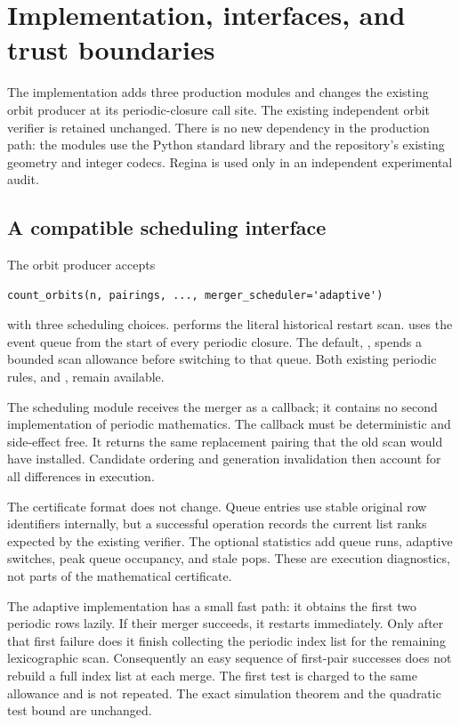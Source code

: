 \section{Implementation, interfaces, and trust boundaries}
\label{sec:implementation}

The implementation adds three production modules and changes the existing
orbit producer at its periodic-closure call site.  The existing independent
orbit verifier is retained unchanged.  There is no new dependency in the
production path: the modules use the Python standard library and the
repository's existing geometry and integer codecs.  Regina is used only in
an independent experimental audit.

\subsection{A compatible scheduling interface}

The orbit producer accepts
\begin{verbatim}
count_orbits(n, pairings, ..., merger_scheduler='adaptive')
\end{verbatim}
with three scheduling choices.   performs the literal historical
restart scan.   uses the event queue from the start of every
periodic closure.  The default, , spends a bounded scan
allowance before switching to that queue.  Both existing periodic rules,
 and , remain available.

The scheduling module receives the merger as a callback; it contains no
second implementation of periodic mathematics.  The callback must be
deterministic and side-effect free.  It returns the same replacement pairing
that the old scan would have installed.  Candidate ordering and generation
invalidation then account for all differences in execution.

The certificate format does not change.  Queue entries use stable original
row identifiers internally, but a successful operation records the current
list ranks expected by the existing verifier.  The optional statistics add
queue runs, adaptive switches, peak queue occupancy, and stale pops.  These
are execution diagnostics, not parts of the mathematical certificate.

The adaptive implementation has a small fast path: it obtains the first two
periodic rows lazily.  If their merger succeeds, it restarts immediately.
Only after that first failure does it finish collecting the periodic index
list for the remaining lexicographic scan.  Consequently an easy sequence
of first-pair successes does not rebuild a full index list at each merge.
The first test is charged to the same allowance and is not repeated.  The
exact simulation theorem and the quadratic test bound are unchanged.

